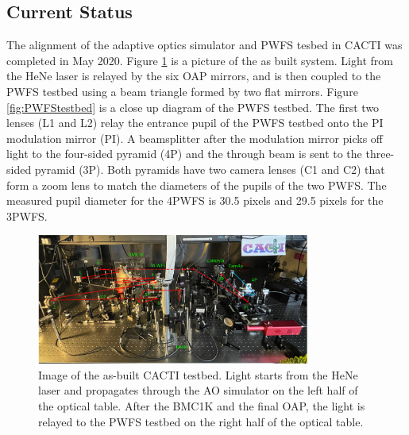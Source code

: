\documentclass[12pt]{spieman}  %
\begin{document}
\begin{spacing}{2}


\subsection{Current Status}

The alignment of the adaptive optics simulator and PWFS tesbed in CACTI was completed in May 2020. Figure \ref{fig:cactiTestbed} is a picture of the as built system. Light from the HeNe laser is relayed by the six OAP mirrors, and is then coupled to the PWFS testbed using a beam triangle formed by two flat mirrors. Figure \ref{fig:PWFStestbed} is a close up diagram of the PWFS testbed. The first two lenses (L1 and L2) relay the entrance pupil of the PWFS testbed onto the PI modulation mirror (PI). A beamsplitter after the modulation mirror picks off light to the four-sided pyramid (4P) and the through beam is sent to the three-sided pyramid (3P). Both pyramids have two camera lenses (C1 and C2) that form a zoom lens to match the diameters of the pupils of the two PWFS. The measured pupil diameter for the 4PWFS is 30.5 pixels and 29.5 pixels for the 3PWFS. 

\begin{figure}
    \centering
    \includegraphics[width=0.8\textwidth]{cactiTestbed.png}
    \caption{Image of the as-built CACTI testbed. Light starts from the HeNe laser and propagates through the AO simulator on the left half of the optical table. After the BMC1K and the final OAP, the light is relayed to the PWFS testbed on the right half of the optical table.}
    \label{fig:cactiTestbed}
\end{figure}


\end{spacing}
\end{document}
